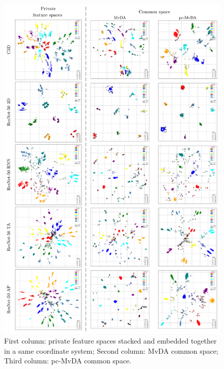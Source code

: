     \begin{figure}[htbp]
        \centering
        \includegraphics[width=1\linewidth, height=0.6\pdfpageheight, keepaspectratio=false]{figs/mica-tsne.png}
        \caption{First column: private feature spaces stacked and embedded together in a same coordinate system; Second column: MvDA common space; Third column: pc-MvDA common space.}
        \label{fig:mica-tsne}
    \end{figure}
